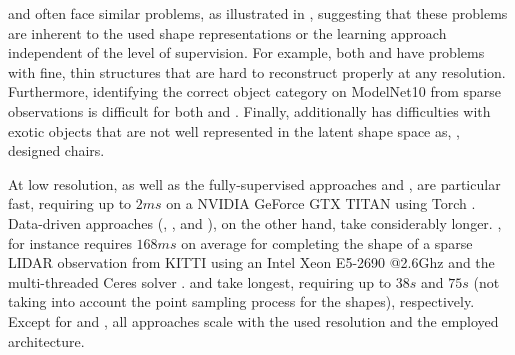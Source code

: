 %
\AML and \Dai often face similar problems, as illustrated in , suggesting that these problems are inherent to the used shape representations or the learning approach independent of the level of supervision. For example, both \AML and \Dai have problems with fine, thin structures that are hard to reconstruct properly at any resolution. Furthermore, identifying the correct object category on ModelNet10 from sparse observations is difficult for both \AML and \Sup. Finally, \AML additionally has difficulties with exotic objects that are not well represented in the latent shape space as, \eg, designed chairs.

%
{At low resolution, \AML as well as the fully-supervised approaches \Dai and \Sup, are particular fast, requiring up to $2ms$ on a NVIDIA\texttrademark\xspace GeForce\textregistered\xspace GTX TITAN using Torch \citep{Collobert2011NIPSWORK}. Data-driven approaches (\eg, \Engelmann, \ICP and \ML), on the other hand, take considerably longer. \Engelmann, for instance requires $168ms$ on average for completing the shape of a sparse LIDAR observation from KITTI using an Intel\textregistered\xspace Xeon\textregistered\xspace E5-2690 @2.6Ghz and the multi-threaded Ceres solver \citep{AgarwalCeres}. \ICP and \ML take longest, requiring up to $38s$ and $75s$ (not taking into account the point sampling process for the shapes), respectively. Except for \Engelmann and \ICP, all approaches scale with the used resolution and the employed architecture.}
